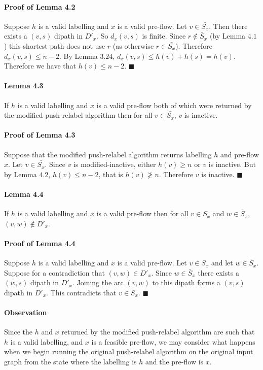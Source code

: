\documentclass[letterpaper,12pt,oneside,onecolumn]{article}
\begin{document}
 \paragraph{Proof of Lemma 4.2}
 Suppose $h$ is a valid labelling and $x$ is a valid pre-flow. Let $v \in \bar{S_x}$. Then there exists a $(v,s)$ dipath in $D'_x$. So $d_x(v,s)$ is finite. Since $r \not\in \bar{S}_x$ (by Lemma $4.1$) this shortest path does not use $r$ (as otherwise $r \in \bar{S_x}$). Therefore $d_x(v,s) \leq n-2$. By Lemma $3.24$, $d_x(v,s) \leq h(v) + h(s) = h(v)$. Therefore we have that $h(v) \leq n-2$. $\blacksquare$
 \paragraph{Lemma 4.3}
 If $h$ is a valid labelling and $x$ is a valid pre-flow both of which were returned by the modified push-relabel algorithm then for all $v \in \bar{S_x}$, $v$ is inactive.
 \paragraph{Proof of Lemma 4.3}
 Suppose that the modified push-relabel algorithm returns labelling $h$ and pre-flow $x$. Let $v \in \bar{S_x}$. Since $v$ is modified-inactive, either $h(v) \geq n$ or $v$ is inactive. But by Lemma $4.2$, $h(v) \leq n-2$, that is $h(v) \not\geq n$. Therefore $v$ is inactive. $\blacksquare$  
 \paragraph{Lemma 4.4}
 If $h$ is a valid labelling and $x$ is a valid pre-flow then for all $v \in S_x$ and $w \in \bar{S}_x$, $(v,w) \not\in D'_x$.
 \paragraph{Proof of Lemma 4.4}
Suppose $h$ is a valid labelling and $x$ is a valid pre-flow. Let $v \in S_x$ and let $w \in \bar{S}_x$. Suppose for a contradiction that $(v,w) \in D'_x$. Since $w \in \bar{S}_x$ there exists a $(w,s)$ dipath in $D'_x$. Joining the arc $(v,w)$ to this dipath forms a $(v,s)$ dipath in $D'_x$. This contradicts that $v \in S_x$. $\blacksquare$
\paragraph{Observation}
Since the $h$ and $x$ returned by the modified push-relabel algorithm are such that $h$ is a valid labelling, and $x$ is a feasible pre-flow, we may consider what happens when we begin running the original push-relabel algorithm on the original input graph from the state where the labelling is $h$ and the pre-flow is $x$.
\end{document}
